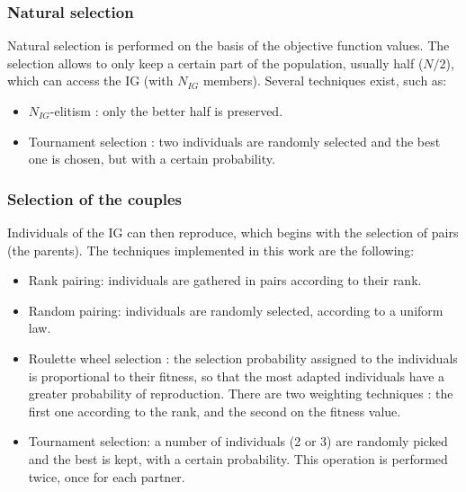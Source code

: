 \documentclass{ametsoc}
\begin{document}
\subsubsection{Natural selection}
\label{sec:gas:nat_selection}

Natural selection is performed on the basis of the objective function values. The selection allows to only keep a certain part of the population, usually half ($N/2$), which can access the IG (with $N_{IG}$ members). Several techniques exist, such as:

\begin{itemize}
	\item $N_{IG}$-elitism \citep{Michalewicz1996}: only the better half is preserved. 
	
	\item Tournament selection \citep{Michalewicz1996, Zitzler2004a}: two individuals are randomly selected and the best one is chosen, but with a certain probability.
\end{itemize}


\subsubsection{Selection of the couples}
\label{sec:gas:selection_couples}

Individuals of the IG can then reproduce, which begins with the selection of pairs (the parents). The techniques implemented in this work are the following:


\begin{itemize}
	\item Rank pairing: individuals are gathered in pairs according to their rank.
	
	\item Random pairing: individuals are randomly selected, according to a uniform law.
	
	\item Roulette wheel selection \citep{Goldberg1989}: the selection probability assigned to the individuals is proportional to their fitness, so that the most adapted individuals have a greater probability of reproduction. There are two weighting techniques : the first one according to the rank, and the second on the fitness value.
	
	\item Tournament selection: a number of individuals (2 or 3) are randomly picked and the best is kept, with a certain probability. This operation is performed twice, once for each partner.
\end{itemize}
\end{document}
